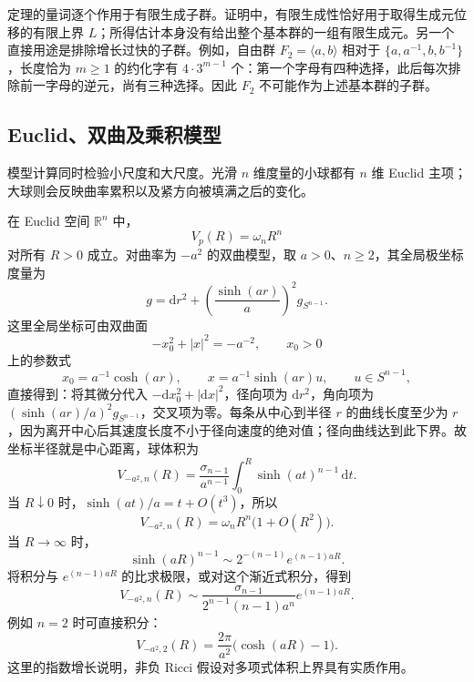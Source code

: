 定理的量词逐个作用于有限生成子群。证明中，有限生成性恰好用于取得生成元位移的有限上界 \(L\)；所得估计本身没有给出整个基本群的一组有限生成元。另一个直接用途是排除增长过快的子群。例如，自由群 \(F_2=\langle a,b\rangle\) 相对于 \(\{a,a^{-1},b,b^{-1}\}\)，长度恰为 \(m\ge1\) 的约化字有 \(4\cdot3^{m-1}\) 个：第一个字母有四种选择，此后每次排除前一字母的逆元，尚有三种选择。因此 \(F_2\) 不可能作为上述基本群的子群。

\subsection{Euclid、双曲及乘积模型}
\label{g3:subsec:0803:04}

模型计算同时检验小尺度和大尺度。光滑 \(n\) 维度量的小球都有 \(n\) 维 Euclid 主项；大球则会反映曲率累积以及紧方向被填满之后的变化。

\begin{example}\label{g3:exm:euclidean-hyperbolic-volume-growth}
	在 Euclid 空间 \(\mathbb R^n\) 中，
	\[
		V_p(R)=\omega_nR^n
	\]
	对所有 \(R>0\) 成立。对曲率为 \(-a^2\) 的双曲模型，取 \(a>0\)、\(n\ge2\)，其全局极坐标度量为
	\[
		g=\mathrm dr^2+
		\left(\frac{\sinh(ar)}a\right)^2g_{S^{n-1}}.
	\]
	这里全局坐标可由双曲面
	\[
		-x_0^2+|x|^2=-a^{-2},\qquad x_0>0
	\]
	上的参数式
	\[
		x_0=a^{-1}\cosh(ar),\qquad
		x=a^{-1}\sinh(ar)u,\qquad u\in S^{n-1},
	\]
	直接得到：将其微分代入 \(-\mathrm dx_0^2+|\mathrm dx|^2\)，径向项为 \(\mathrm dr^2\)，角向项为 \((\sinh(ar)/a)^2g_{S^{n-1}}\)，交叉项为零。每条从中心到半径 \(r\) 的曲线长度至少为 \(r\)，因为离开中心后其速度长度不小于径向速度的绝对值；径向曲线达到此下界。故坐标半径就是中心距离，球体积为
	\begin{equation}\label{g3:eq:hyperbolic-volume-growth}
		V_{-a^2,n}(R)
		=\frac{\sigma_{n-1}}{a^{n-1}}
		\int_0^R\sinh(at)^{n-1}\,\mathrm dt.
	\end{equation}
	当 \(R\downarrow0\) 时，\(\sinh(at)/a=t+O(t^3)\)，所以
	\[
		V_{-a^2,n}(R)=\omega_nR^n\bigl(1+O(R^2)\bigr).
	\]
	当 \(R\to\infty\) 时，
	\[
		\sinh(aR)^{n-1}
		\sim 2^{-(n-1)}e^{(n-1)aR}.
	\]
	将积分与 \(e^{(n-1)aR}\) 的比求极限，或对这个渐近式积分，得到
	\begin{equation}\label{g3:eq:hyperbolic-volume-asymptotic}
		V_{-a^2,n}(R)
		\sim
		\frac{\sigma_{n-1}}{2^{n-1}(n-1)a^n}
		e^{(n-1)aR}.
	\end{equation}
	例如 \(n=2\) 时可直接积分：
	\[
		V_{-a^2,2}(R)=\frac{2\pi}{a^2}\bigl(\cosh(aR)-1\bigr).
	\]
	这里的指数增长说明，非负 Ricci 假设对多项式体积上界具有实质作用。
\end{example}

